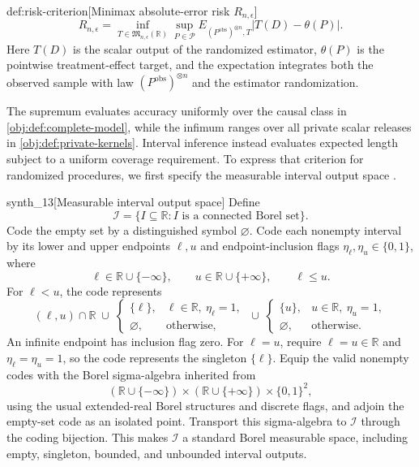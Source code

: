 \begin{definitionv}{def:risk-criterion}[Minimax absolute-error risk \(R_{n,\epsilon}\)]
\[
R_{n,\epsilon}
=
\inf_{T\in\mathfrak M_{n,\epsilon}(\mathbb R)}
\sup_{P\in\mathcal P}
E_{(P^{\mathrm{obs}})^{\otimes n},T}
\bigl|T(D)-\theta(P)\bigr|.
\]
Here \(T(D)\) is the scalar output of the randomized estimator, \(\theta(P)\) is the pointwise treatment-effect target, and the expectation integrates both the observed sample with law \((P^{\mathrm{obs}})^{\otimes n}\) and the estimator randomization.
\end{definitionv}

The supremum evaluates accuracy uniformly over the causal class in \cref{obj:def:complete-model}, while the infimum ranges over all private scalar releases in \cref{obj:def:private-kernels}. Interval inference instead evaluates expected length subject to a uniform coverage requirement. To express that criterion for randomized procedures, we first specify the measurable interval output space .

\begin{definitionv}{synth_13}[Measurable interval output space]
Define
\[
\mathcal I=\{I\subseteq\mathbb R:I\text{ is a connected Borel set}\}.
\]
Code the empty set by a distinguished symbol \(\varnothing\). Code each nonempty interval by its lower and upper endpoints \(\ell,u\) and endpoint-inclusion flags \(\eta_\ell,\eta_u\in\{0,1\}\), where
\[
\ell\in\mathbb R\cup\{-\infty\},\qquad
u\in\mathbb R\cup\{+\infty\},\qquad \ell\le u.
\]
For \(\ell<u\), the code represents
\[
(\ell,u)\cap\mathbb R
\;\cup\;
\begin{cases}\{\ell\},&\ell\in\mathbb R,\ \eta_\ell=1,\\ \varnothing,&\text{otherwise},\end{cases}
\;\cup\;
\begin{cases}\{u\},&u\in\mathbb R,\ \eta_u=1,\\ \varnothing,&\text{otherwise}.\end{cases}
\]
An infinite endpoint has inclusion flag zero. For \(\ell=u\), require \(\ell=u\in\mathbb R\) and \(\eta_\ell=\eta_u=1\), so the code represents the singleton \(\{\ell\}\). Equip the valid nonempty codes with the Borel sigma-algebra inherited from
\[
(\mathbb R\cup\{-\infty\})\times
(\mathbb R\cup\{+\infty\})\times\{0,1\}^2,
\]
using the usual extended-real Borel structures and discrete flags, and adjoin the empty-set code as an isolated point. Transport this sigma-algebra to \(\mathcal I\) through the coding bijection. This makes \(\mathcal I\) a standard Borel measurable space, including empty, singleton, bounded, and unbounded interval outputs.
\end{definitionv}

